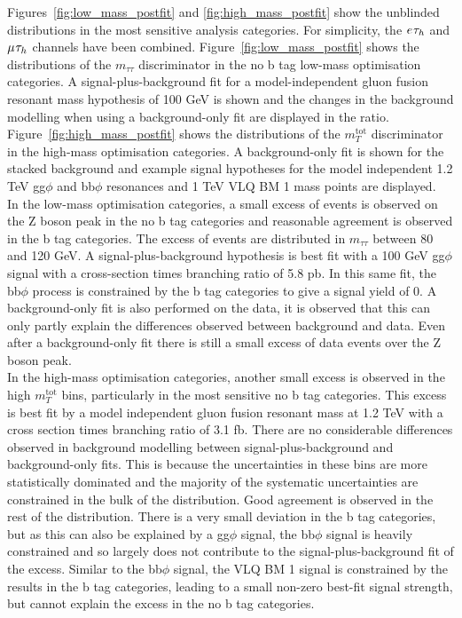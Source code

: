 Figures~\ref{fig:low_mass_postfit} and \ref{fig:high_mass_postfit} show the unblinded distributions in the most sensitive analysis categories.
For simplicity, the $e_{}\tau_{h}$ and $\mu_{}\tau_{h}$ channels have been combined.
Figure~\ref{fig:low_mass_postfit} shows the distributions of the $m_{\tau\tau}$ discriminator in the no b tag low-mass optimisation categories. 
A signal-plus-background fit for a model-independent gluon fusion resonant mass hypothesis of 100 GeV is shown and the changes in the background modelling when using a background-only fit are displayed in the ratio.
Figure~\ref{fig:high_mass_postfit} shows the distributions of the $m_{T}^{\text{tot}}$ discriminator in the high-mass optimisation categories.
A background-only fit is shown for the stacked background and example signal hypotheses for the model independent 1.2 TeV gg$\phi$ and bb$\phi$ resonances and 1 TeV VLQ BM 1 mass points are displayed. \\

In the low-mass optimisation categories, a small excess of events is observed on the Z boson peak in the no b tag categories and reasonable agreement is observed in the b tag categories.
The excess of events are distributed in $m_{\tau\tau}$ between 80 and 120 GeV.
A signal-plus-background hypothesis is best fit with a 100 GeV gg$\phi$ signal with a cross-section times branching ratio of 5.8 pb. 
In this same fit, the bb$\phi$ process is constrained by the b tag categories to give a signal yield of 0.
A background-only fit is also performed on the data, it is observed that this can only partly explain the differences observed between background and data.
Even after a background-only fit there is still a small excess of data events over the Z boson peak. \\

In the high-mass optimisation categories, another small excess is observed in the high $m_{T}^{\text{tot}}$ bins, particularly in the most sensitive no b tag categories.
This excess is best fit by a model independent gluon fusion resonant mass at 1.2 TeV with a cross section times branching ratio of 3.1 fb.
There are no considerable differences observed in background modelling between signal-plus-background and background-only fits.
This is because the uncertainties in these bins are more statistically dominated and the majority of the systematic uncertainties are constrained in the bulk of the distribution.
Good agreement is observed in the rest of the distribution.
There is a very small deviation in the b tag categories, but as this can also be explained by a gg$\phi$ signal, the bb$\phi$ signal is heavily constrained and so largely does not contribute to the signal-plus-background fit of the excess.
Similar to the bb$\phi$ signal, the VLQ BM 1 signal is constrained by the results in the b tag categories, leading to a small non-zero best-fit signal strength, but cannot explain the excess in the no b tag categories. \\

